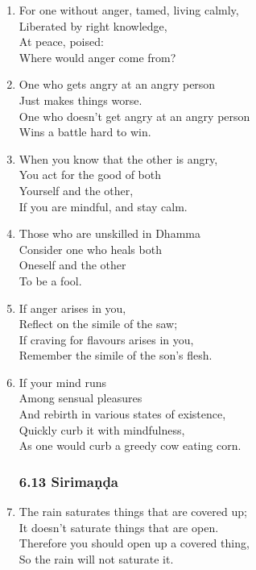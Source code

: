 \documentclass[10pt, openany]{book}
\begin{document}
\begin{enumerate}
\item For one without anger, tamed, living calmly,\\
Liberated by right knowledge,\\
At peace, poised:\\
Where would anger come from?

\item One who gets angry at an angry person\\
Just makes things worse.\\
One who doesn’t get angry at an angry person\\
Wins a battle hard to win.

\item When you know that the other is angry,\\
You act for the good of both\\
Yourself and the other,\\
If you are mindful, and stay calm.

\item Those who are unskilled in Dhamma\\
Consider one who heals both\\
Oneself and the other\\
To be a fool.

\item If anger arises in you,\\
Reflect on the simile of the saw;\\
If craving for flavours arises in you,\\
Remember the simile of the son’s flesh.

\item If your mind runs\\
Among sensual pleasures \\
And rebirth in various states of existence,\\
Quickly curb it with mindfulness,\\
As one would curb a greedy cow eating corn.

\subsubsection*{6.13 Sirimaṇḍa}

\item The rain saturates things that are covered up;\\
It doesn’t saturate things that are open.\\
Therefore you should open up a covered thing,\\
So the rain will not saturate it.


\end{enumerate}
\end{document}
